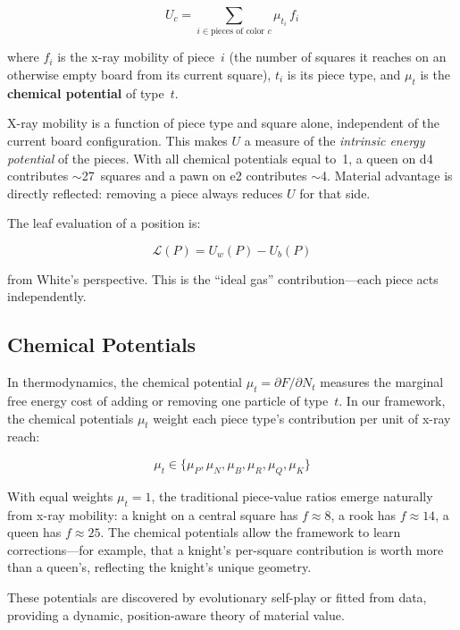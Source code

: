 \documentclass[11pt,a4paper]{article}
\begin{document}
\begin{equation}
U_c = \sum_{i \in \text{pieces of color } c} \mu_{t_i} \, f_i
\end{equation}

where $f_i$ is the x-ray mobility of piece~$i$ (the number of squares it
reaches on an otherwise empty board from its current square), $t_i$ is its
piece type, and $\mu_t$ is the \textbf{chemical potential} of type~$t$.

X-ray mobility is a function of piece type and square alone, independent
of the current board configuration. This makes $U$ a measure of the
\emph{intrinsic energy potential} of the pieces. With all chemical
potentials equal to~1, a queen on d4 contributes $\sim$27~squares and a
pawn on e2 contributes $\sim$4. Material advantage is directly reflected:
removing a piece always reduces $U$ for that side.

The leaf evaluation of a position is:

\begin{equation}
\mathcal{L}(P) = U_w(P) - U_b(P)
\end{equation}

from White's perspective. This is the ``ideal gas'' contribution---each
piece acts independently.

\subsection{Chemical Potentials}

In thermodynamics, the chemical potential $\mu_t = \partial F / \partial
N_t$ measures the marginal free energy cost of adding or removing one
particle of type~$t$. In our framework, the chemical potentials $\mu_t$
weight each piece type's contribution per unit of x-ray reach:

\begin{equation}
\mu_t \in \{\mu_P, \mu_N, \mu_B, \mu_R, \mu_Q, \mu_K\}
\end{equation}

With equal weights $\mu_t = 1$, the traditional piece-value ratios emerge
naturally from x-ray mobility: a knight on a central square has
$f \approx 8$, a rook has $f \approx 14$, a queen has $f \approx 25$. The
chemical potentials allow the framework to learn corrections---for example,
that a knight's per-square contribution is worth more than a queen's,
reflecting the knight's unique geometry.

These potentials are discovered by evolutionary self-play or fitted from
data, providing a dynamic, position-aware theory of material value.
\end{document}
